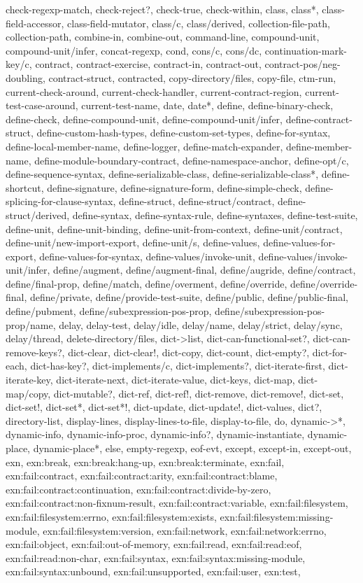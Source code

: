 {{check-regexp-match, check-reject?, check-true, check-within, class, class*, class-field-accessor, class-field-mutator, class/c, class/derived, collection-file-path, collection-path, combine-in, combine-out, command-line, compound-unit, compound-unit/infer, concat-regexp, cond, cons/c, cons/dc, continuation-mark-key/c, contract, contract-exercise, contract-in, contract-out, contract-pos/neg-doubling, contract-struct, contracted, copy-directory/files, copy-file, ctm-run, current-check-around, current-check-handler, current-contract-region, current-test-case-around, current-test-name, date, date*, define, define-binary-check, define-check, define-compound-unit, define-compound-unit/infer, define-contract-struct, define-custom-hash-types, define-custom-set-types, define-for-syntax, define-local-member-name, define-logger, define-match-expander, define-member-name, define-module-boundary-contract, define-namespace-anchor, define-opt/c, define-sequence-syntax, define-serializable-class, define-serializable-class*, define-shortcut, define-signature, define-signature-form, define-simple-check, define-splicing-for-clause-syntax, define-struct, define-struct/contract, define-struct/derived, define-syntax, define-syntax-rule, define-syntaxes, define-test-suite, define-unit, define-unit-binding, define-unit-from-context, define-unit/contract, define-unit/new-import-export, define-unit/s, define-values, define-values-for-export, define-values-for-syntax, define-values/invoke-unit, define-values/invoke-unit/infer, define/augment, define/augment-final, define/augride, define/contract, define/final-prop, define/match, define/overment, define/override, define/override-final, define/private, define/provide-test-suite, define/public, define/public-final, define/pubment, define/subexpression-pos-prop, define/subexpression-pos-prop/name, delay, delay-test, delay/idle, delay/name, delay/strict, delay/sync, delay/thread, delete-directory/files, dict->list, dict-can-functional-set?, dict-can-remove-keys?, dict-clear, dict-clear!, dict-copy, dict-count, dict-empty?, dict-for-each, dict-has-key?, dict-implements/c, dict-implements?, dict-iterate-first, dict-iterate-key, dict-iterate-next, dict-iterate-value, dict-keys, dict-map, dict-map/copy, dict-mutable?, dict-ref, dict-ref!, dict-remove, dict-remove!, dict-set, dict-set!, dict-set*, dict-set*!, dict-update, dict-update!, dict-values, dict?, directory-list, display-lines, display-lines-to-file, display-to-file, do, dynamic->*, dynamic-info, dynamic-info-proc, dynamic-info?, dynamic-instantiate, dynamic-place, dynamic-place*, else, empty-regexp, eof-evt, except, except-in, except-out, exn, exn:break, exn:break:hang-up, exn:break:terminate, exn:fail, exn:fail:contract, exn:fail:contract:arity, exn:fail:contract:blame, exn:fail:contract:continuation, exn:fail:contract:divide-by-zero, exn:fail:contract:non-fixnum-result, exn:fail:contract:variable, exn:fail:filesystem, exn:fail:filesystem:errno, exn:fail:filesystem:exists, exn:fail:filesystem:missing-module, exn:fail:filesystem:version, exn:fail:network, exn:fail:network:errno, exn:fail:object, exn:fail:out-of-memory, exn:fail:read, exn:fail:read:eof, exn:fail:read:non-char, exn:fail:syntax, exn:fail:syntax:missing-module, exn:fail:syntax:unbound, exn:fail:unsupported, exn:fail:user, exn:test, }}
